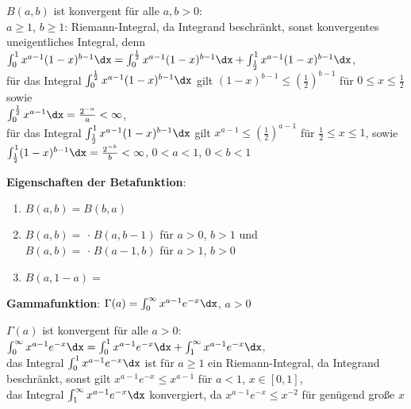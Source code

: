 $B(a, b)$ ist konvergent für alle $a, b > 0$: \\
$a \ge 1$, $b \ge 1$: Riemann-Integral, da Integrand beschränkt,
sonst konvergentes uneigentliches Integral, denn
$\int_0^1 x^{a-1} (1 - x)^{b-1} \dx =
\int_0^{\frac{1}{2}} x^{a-1} (1 - x)^{b-1} \dx +
\int_{\frac{1}{2}}^1 x^{a-1} (1 - x)^{b-1} \dx$, \\
für das Integral $\int_0^{\frac{1}{2}} x^{a-1} (1 - x)^{b-1} \dx$
gilt $(1 - x)^{b-1} \le \left(\frac{1}{2}\right)^{b-1}$ für
$0 \le x \le \frac{1}{2}$ sowie \\
$\int_0^{\frac{1}{2}} x^{a-1} \dx = \frac{2^{-a}}{a} < \infty$, \\
für das Integral $\int_{\frac{1}{2}}^1 x^{a-1} (1 - x)^{b-1} \dx$
gilt $x^{a-1} \le \left(\frac{1}{2}\right)^{a-1}$ für
$\frac{1}{2} \le x \le 1$, sowie \\
$\int_{\frac{1}{2}}^1 (1 - x)^{b-1} \dx =
\frac{2^{-b}}{b} < \infty$, $0 < a < 1$, $0 < b < 1$

\textbf{Eigenschaften der Betafunktion}:
\begin{enumerate}
    \item
    $B(a, b) = B(b, a)$

    \item
    $B(a, b) =$
     $\cdot\; B(a, b - 1)$
    für $a > 0$, $b > 1$ und \\
    $B(a, b) =$
     $\cdot\; B(a - 1, b)$
    für $a > 1$, $b > 0$

    \item
    $B(a, 1 - a) =$
\end{enumerate}

\linie

\textbf{Gammafunktion}:
$\Gamma(a) = \int_0^\infty x^{a-1} e^{-x} \dx$, $a > 0$

$\Gamma(a)$ ist konvergent für alle $a > 0$: \\
$\int_0^\infty x^{a-1} e^{-x} \dx = \int_0^1 x^{a-1} e^{-x} \dx +
\int_1^\infty x^{a-1} e^{-x} \dx$, \\
das Integral $\int_0^1 x^{a-1} e^{-x} \dx$ ist für
$a \ge 1$ ein Riemann-Integral, da Integrand beschränkt,
sonst gilt $x^{a-1} e^{-x} \le x^{a-1}$ für $a < 1$, $x \in [0,1]$, \\
das Integral $\int_1^\infty x^{a-1} e^{-x} \dx$ konvergiert, da
$x^{a-1} e^{-x} \le x^{-2}$ für genügend große $x$

